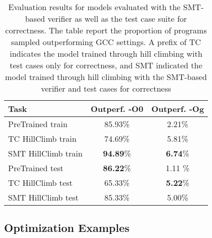 \documentclass{article}
\begin{document}
\begin{table}[t]
\caption{Evaluation results for models evaluated with the SMT-based verifier as well as the test case suite for correctness. The table report the proportion of programs sampled outperforming GCC settings. A prefix of \textsc{TC} indicates the model trained through hill climbing with test cases only for correctness, and \textsc{SMT} indicated the model trained through hill climbing with the SMT-based verifier and test cases for correctness}
\label{tab:z3_eval_results}
\vskip 0.15in
\begin{center}
\begin{small}
\begin{sc}
\begin{tabular}{lcc}
\toprule
Task & Outperf. -O0 & Outperf. -Og \\
\midrule
PreTrained train   & 85.93\% & 2.21\% \\
TC HillClimb train  & 74.69\% & 5.81\% \\
SMT HillClimb train  & \textbf{94.89}\% & \textbf{6.74}\% \\
\midrule
PreTrained test    & \textbf{86.22}\% & 1.11 \% \\
TC HillClimb test  & 65.33\% & \textbf{5.22}\% \\
SMT HillClimb test  & 85.33\% & 5.00\% \\
\bottomrule
\end{tabular}
\end{sc}
\end{small}
\end{center}
\vskip -0.1in
\end{table}


\subsection{Optimization Examples}

\label{sec:sec:opt_examples}

\newcommand{\ozerocodecaption}{-O0 code\xspace}
\newcommand{\ogcodecaption}{-Og code\xspace}
\newcommand{\modelcodecaption}{Model-optimized code\xspace}
\newcommand{\codeboxwidth}{.47\columnwidth}
\end{document}
